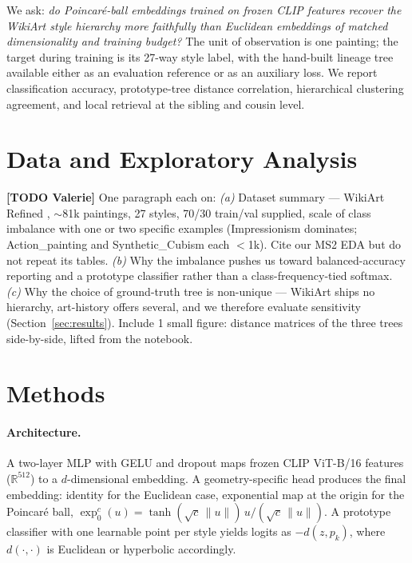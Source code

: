 \documentclass[11pt]{article}
\newcommand{\TODO}[2]{\textcolor{red!70!black}{\textbf{[TODO #1]} #2}}
\begin{document}
We ask: \emph{do Poincar\'e-ball embeddings trained on frozen CLIP features
recover the WikiArt style hierarchy more faithfully than Euclidean embeddings
of matched dimensionality and training budget?} The unit of observation is
one painting; the target during training is its 27-way style label, with the
hand-built lineage tree available either as an evaluation reference or as an
auxiliary loss. We report classification accuracy, prototype-tree distance
correlation, hierarchical clustering agreement, and local retrieval at the
sibling and cousin level.

\section{Data and Exploratory Analysis} %

\TODO{Valerie}{One paragraph each on:
\textit{(a)} Dataset summary --- WikiArt Refined \citep{tan2019artgan},
$\sim$81k paintings, 27 styles, 70/30 train/val supplied, scale of class
imbalance with one or two specific examples (Impressionism dominates;
Action\_painting and Synthetic\_Cubism each $<$1k). Cite our MS2 EDA but
do not repeat its tables.
\textit{(b)} Why the imbalance pushes us toward balanced-accuracy reporting
and a prototype classifier rather than a class-frequency-tied softmax.
\textit{(c)} Why the choice of ground-truth tree is non-unique --- WikiArt
ships no hierarchy, art-history offers several, and we therefore evaluate
sensitivity (Section~\ref{sec:results}). Include 1 small figure: distance
matrices of the three trees side-by-side, lifted from the notebook.}

\section{Methods} %

\paragraph{Architecture.} A two-layer MLP with GELU and dropout maps frozen
CLIP ViT-B/16 features ($\mathbb{R}^{512}$) to a $d$-dimensional embedding.
A geometry-specific head produces the final embedding: identity for the
Euclidean case, exponential map at the origin for the Poincar\'e ball,
\(\exp_0^c(u) = \tanh(\sqrt{c}\,\|u\|) \, u / (\sqrt{c}\,\|u\|)\). A
prototype classifier with one learnable point per style yields logits as
$-d(z, p_k)$, where $d(\cdot,\cdot)$ is Euclidean or hyperbolic accordingly.
\end{document}
